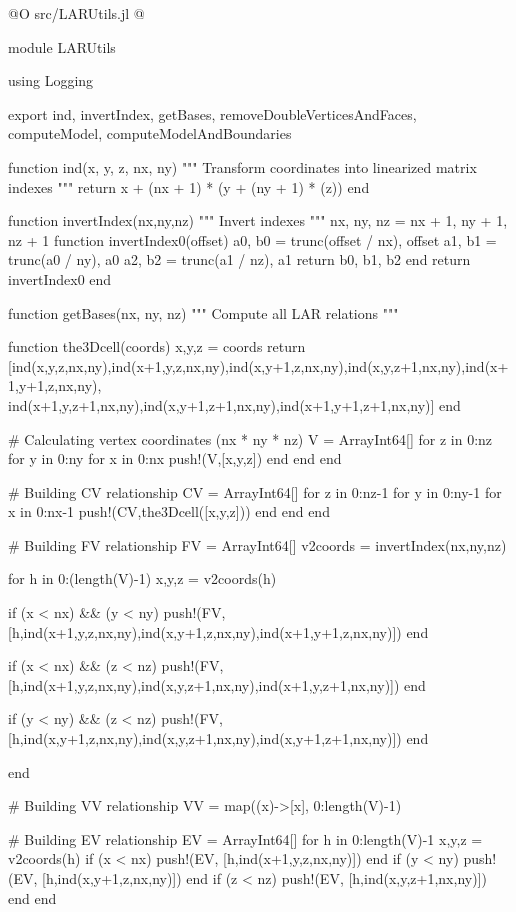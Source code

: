 \documentclass[11pt,oneside]{article}	%
\begin{document}
@O src/LARUtils.jl
@{module LARUtils

using Logging

export ind, invertIndex, getBases, removeDoubleVerticesAndFaces, computeModel, computeModelAndBoundaries

function ind(x, y, z, nx, ny)
    """
    Transform coordinates into linearized matrix indexes
    """
    return x + (nx + 1) * (y + (ny + 1) * (z))
  end


function invertIndex(nx,ny,nz)
  """
  Invert indexes
  """
  nx, ny, nz = nx + 1, ny + 1, nz + 1
  function invertIndex0(offset)
      a0, b0 = trunc(offset / nx), offset %
      a1, b1 = trunc(a0 / ny), a0 %
      a2, b2 = trunc(a1 / nz), a1 %
      return b0, b1, b2
  end
  return invertIndex0
end


function getBases(nx, ny, nz)
  """
  Compute all LAR relations
  """

  function the3Dcell(coords)
    x,y,z = coords
    return [ind(x,y,z,nx,ny),ind(x+1,y,z,nx,ny),ind(x,y+1,z,nx,ny),ind(x,y,z+1,nx,ny),ind(x+1,y+1,z,nx,ny),
            ind(x+1,y,z+1,nx,ny),ind(x,y+1,z+1,nx,ny),ind(x+1,y+1,z+1,nx,ny)]
  end

  # Calculating vertex coordinates (nx * ny * nz)
  V = Array{Int64}[]
  for z in 0:nz
    for y in 0:ny
      for x in 0:nx
        push!(V,[x,y,z])
      end
    end
  end

  # Building CV relationship
  CV = Array{Int64}[]
  for z in 0:nz-1
    for y in 0:ny-1
      for x in 0:nx-1
        push!(CV,the3Dcell([x,y,z]))
      end
    end
  end

  # Building FV relationship
  FV = Array{Int64}[]
  v2coords = invertIndex(nx,ny,nz)

  for h in 0:(length(V)-1)
    x,y,z = v2coords(h)

    if (x < nx) && (y < ny)
      push!(FV, [h,ind(x+1,y,z,nx,ny),ind(x,y+1,z,nx,ny),ind(x+1,y+1,z,nx,ny)])
    end

    if (x < nx) && (z < nz)
      push!(FV, [h,ind(x+1,y,z,nx,ny),ind(x,y,z+1,nx,ny),ind(x+1,y,z+1,nx,ny)])
    end

    if (y < ny) && (z < nz)
      push!(FV,[h,ind(x,y+1,z,nx,ny),ind(x,y,z+1,nx,ny),ind(x,y+1,z+1,nx,ny)])
    end

  end

  # Building VV relationship
  VV = map((x)->[x], 0:length(V)-1)

  # Building EV relationship
  EV = Array{Int64}[]
  for h in 0:length(V)-1
    x,y,z = v2coords(h)
    if (x < nx)
      push!(EV, [h,ind(x+1,y,z,nx,ny)])
    end
    if (y < ny)
      push!(EV, [h,ind(x,y+1,z,nx,ny)])
    end
    if (z < nz)
      push!(EV, [h,ind(x,y,z+1,nx,ny)])
    end
  end

}
\end{document}
